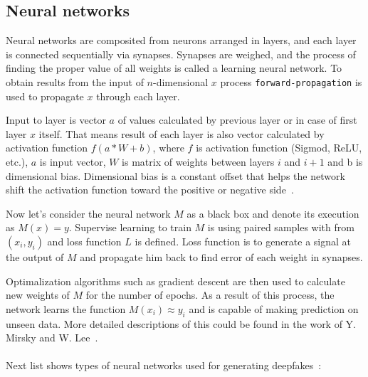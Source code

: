 \subsection{Neural networks}

Neural networks are composited from neurons arranged in layers, and each layer is connected sequentially via synapses. Synapses are weighed, and the process of finding the proper value of all weights is called a learning neural network. To obtain results from the input of \(n\)-dimensional \(x\) process \texttt{forward-propagation} is used to propagate \(x\) through each layer.

Input to layer is vector \(a\) of values calculated by previous layer or in case of first layer \(x\) itself. That means result of each layer is also vector calculated by activation function \(f(a*W+b)\), where \(f\) is activation function (Sigmod, ReLU, etc.), \(a\) is input vector, \(W\) is matrix of weights between layers \(i\) and \(i+1\) and b is dimensional bias. Dimensional bias is a constant offset that helps the network shift the activation function toward the positive or negative side~\cite{NeuralNetworkBias}.

Now let’s consider the neural network \(M\) as a black box and denote its execution as \(M(x) = y\). Supervise learning to train \(M\) is using paired samples with from \((x_i, y_i)\) and loss function \(L\) is defined. Loss function is to generate a signal at the output of \(M\) and propagate him back to find error of each weight in synapses.

Optimalization algorithms such as gradient descent are then used to calculate new weights of \(M\) for the number of epochs. As a result of this process, the network learns the function \(M(x_i) \approx y_i\) and is capable of making prediction on unseen data. More detailed descriptions of this could be found in the work of Y. Mirsky and W. Lee~\cite{CreationandDetectionofDeepfakes}. ~\cite{CreationandDetectionofDeepfakes}
\\\\
Next list shows types of neural networks used for generating deepfakes~\cite{CreationandDetectionofDeepfakes}:

